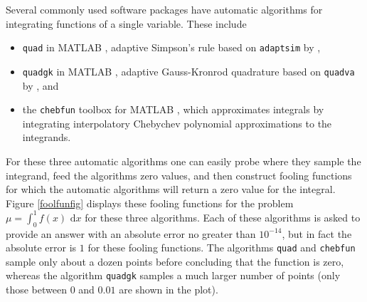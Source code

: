 \documentclass[graybox]{svmult}
\newcommand{\rd}{\,\mathrm{d}}
\newcommand{\dif}{\rd}
\begin{document}
Several commonly used software packages have automatic algorithms for integrating functions of a single variable.  These include 
\begin{itemize} 

\item {\tt quad} in MATLAB \citep{MAT7.12}, adaptive Simpson's rule based on {\tt adaptsim} by \cite{GanGau00a},

\item {\tt quadgk} in MATLAB \citep{MAT7.12}, adaptive Gauss-Kronrod quadrature based on {\tt quadva} by \cite{Sha08a}, and

\item the {\tt chebfun} \citep{TrefEtal12} toolbox for MATLAB \citep{MAT7.12}, which approximates integrals by integrating interpolatory Chebychev polynomial approximations to the integrands.


\end{itemize}

For these three automatic algorithms one can easily probe where they sample the integrand, feed the algorithms zero values, and then construct fooling functions for which the automatic algorithms will return a zero value for the integral.  Figure \ref{foolfunfig} displays these fooling functions for the problem $\mu=\int_0^1 f(x) \, \dif x$ for these three algorithms. Each of these algorithms is asked to provide an answer with an absolute error no greater than $10^{-14}$, but in fact the absolute error is $1$ for these fooling functions.  The algorithms {\tt quad} and {\tt chebfun} sample only about a dozen points before concluding that the function is zero, whereas the algorithm {\tt quadgk} samples a much larger number of points (only those between $0$ and $0.01$ are shown in the plot). 
\end{document}
